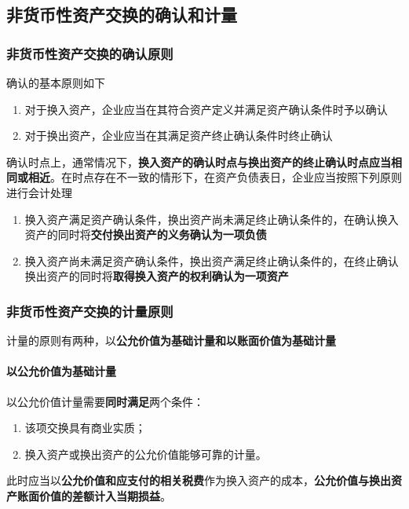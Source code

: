 \documentclass[UTF8,12pt]{ctexart}
\numberwithin{equation}{section} %
\numberwithin{figure}{section}
\numberwithin{table}{section}
\begin{document}
	\subsection{非货币性资产交换的确认和计量}
	\subsubsection{非货币性资产交换的确认原则}
	确认的基本原则如下
	\begin{enumerate}
		\item 对于换入资产，企业应当在其符合资产定义并满足资产确认条件时予以确认
		
		\item 对于换出资产，企业应当在其满足资产终止确认条件时终止确认
	\end{enumerate}
	
	确认时点上，通常情况下，\textbf{换入资产的确认时点与换出资产的终止确认时点应当相同或相近}。在时点存在不一致的情形下，在资产负债表日，企业应当按照下列原则进行会计处理
	\begin{enumerate}
		\item 换入资产满足资产确认条件，换出资产尚未满足终止确认条件的，在确认换入资产的同时将\textbf{交付换出资产的义务确认为一项负债}
		
		\item 换入资产尚未满足资产确认条件，换出资产满足终止确认条件的，在终止确认换出资产的同时将\textbf{取得换入资产的权利确认为一项资产}
	\end{enumerate}
	
	\subsubsection{非货币性资产交换的计量原则}
	计量的原则有两种，以\textbf{公允价值为基础计量和以账面价值为基础计量}
	\paragraph{以公允价值为基础计量}
	以公允价值计量需要\textbf{同时满足}两个条件：
	\begin{enumerate}
		\item 该项交换具有商业实质；
		
		\item 换入资产或换出资产的公允价值能够可靠的计量。
	\end{enumerate}
	
	此时应当以\textbf{公允价值和应支付的相关税费}作为换入资产的成本，\textbf{公允价值与换出资产账面价值的差额计入当期损益}。
	
\end{document}
